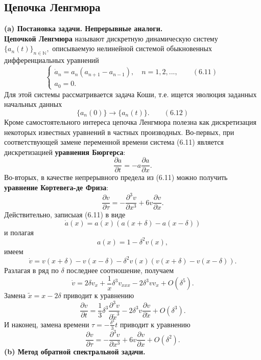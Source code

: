 \documentclass[12pt,a4paper]{article}
\theoremstyle{plain}   \newtheorem{Pro}{Задача}
\begin{document}
\subsection{Цепочка Ленгмюра}
{\bfseries (a) Постановка задачи. Непрерывные аналоги.} \\

{\bfseries Цепочкой Ленгмюра}
называют дискретную динамическую систему
$ \{ a_n (t) \} _{n \in \mathbb{N}}, $
описываемую нелинейной системой обыкновенных
дифференциальных уравнений
\begin{equation*}
  \begin{cases}
    \dot a_n =a_n (a_{n+1}-a_{n-1}),
	  \quad n=1,2,..., \qquad (6.11) \\
	a_0 =0 .
  \end{cases}
\end{equation*}
Для этой системы рассматривается задача Коши,
т.е. ищется эволюция заданных начальных данных
$$
  \{ a_n (0) \} \longrightarrow
    \{ a_n (t) \} .
	  \qquad (6.12)
$$
Кроме самостоятельного интереса цепочка Ленгмюра полезна как
дискретизация некоторых известных уравнений в частных
производных. Во-первых, при соответствующей замене переменной
времени система (6.11) является дискретизацией
{\bfseries уравнения Бюргерса}:
$$
  \frac{\partial a}{\partial t}=-a\frac{\partial a}{\partial x}.
$$
Во-вторых, в качестве непрерывного предела из (6.11)
можно получить
{\bfseries уравнение Кортевега-де Фриза}:
$$
  \frac{\partial v}{\partial \tau}=-
    \frac{\partial ^3 v}{\partial x^3}+
	  6v \frac{\partial v}{\partial x}.
$$
Действительно, записыая (6.11) в виде
$$
  \dot a (x)=a(x) (a(x+\delta )-a(x-\delta ))
$$
и полагая
$$
  a(x)=1-\delta ^2 v(x),
$$
имеем
$$
  \dot v = v(x+\delta )-v(x-\delta )-
    \delta ^2 v(x) (v(x+\delta )-v(x-\delta )).
$$
Разлагая в ряд по
$ \delta $
последнее соотношение, получаем
$$
  \dot v = 2 \delta v_x + \frac{1}{x}\delta ^3 v_{xxx}-
    2\delta ^3 v v_x + O(\delta ^5 ) .
$$
Замена
$ \tilde x =x-2\delta $
приводит к уравнению
$$
  \frac{\partial v}{\partial t}=\frac{1}{3}\delta ^3
    \frac{\partial ^3 v}{\partial \tilde x^3}-
	  2 \delta ^3 v \frac{\partial v}{\partial \tilde x}+
	    O(\delta ^3 ).
$$
И наконец, замена времени
$ \tau =-\frac{\delta ^3}{3}t $
приводит к уравнению
$$
  \frac{\partial v}{\partial \tau}=-
    \frac{\partial ^3 v}{\partial x^3}+6v
	  \frac{\partial v}{\partial x} +
	    O(\delta ^2 ).
$$
$$ \; $$
{\bfseries (b) Метод обратной спектральной задачи.} \\
\end{document}
